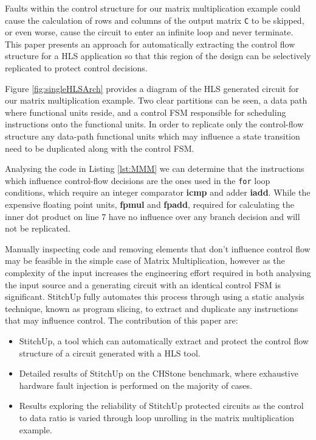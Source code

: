 Faults within the control structure for our matrix multiplication example
could cause the calculation of rows and columns of the output matrix \lstinline$C$ to be skipped,
or even worse, cause the circuit to enter an infinite loop and never terminate.
This paper presents an approach for automatically extracting the control flow structure
for a HLS application so that this region of the design can be selectively
replicated to protect control decisions.

Figure \ref{fig:singleHLSArch} provides a diagram of the HLS generated
circuit for our matrix multiplication example.
Two clear partitions can be seen, a data path where functional units reside, and a
control FSM responsible for scheduling instructions onto the functional units.
In order to replicate only the control-flow structure
any data-path functional units which may influence a state transition need to be
duplicated along with the control FSM.

Analysing the code in Listing \ref{lst:MMM} we can determine that the instructions
which influence control-flow decisions are the ones used in the \lstinline{for} loop
conditions, which require an integer comparator \textbf{icmp} and adder \textbf{iadd}.
While the expensive floating point units, \textbf{fpmul} and \textbf{fpadd}, required
for calculating the inner dot product on line 7 have no
influence over any branch decision and will not be replicated.

Manually inspecting code and removing elements that don't influence control flow
may be feasible in the simple case of Matrix Multiplication, however as the complexity of the input increases
the engineering effort required in both analysing the input source and a generating circuit with an identical control FSM is
significant.
StitchUp fully automates this process through using a static analysis technique, known as program slicing, to extract
and duplicate any instructions that may influence control. The contribution of this paper are:
\vspace{-4pt}
\begin{itemize}
	\setlength{\itemsep}{1pt}
	\setlength{\parskip}{0pt}
	\setlength{\parsep}{0pt}
	\item StitchUp, a tool which can automatically extract and protect the control flow structure of a circuit generated with a HLS tool.
	\item Detailed results of StitchUp on the CHStone benchmark, where exhaustive hardware fault injection is performed on the majority of cases.
	\item Results exploring the reliability of StitchUp protected circuits as the control to data ratio is varied through
	loop unrolling in the matrix multiplication example.
\end{itemize}

